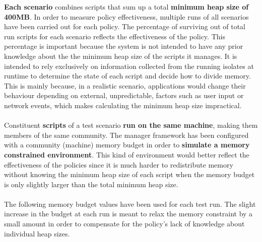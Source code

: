 \documentclass{l4proj}
\begin{document}
\hspace*{1em} \textbf{Each scenario} combines scripts that sum up a total \textbf{minimum heap size of 400MB}. In order to measure policy effectiveness, multiple runs of all scenarios have been carried out for each policy. The percentage of surviving out of total run scripts for each scenario reflects the effectiveness of the policy. This percentage is important because the system is not intended to have any prior knowledge about the the minimum heap size of the scripts it manages. It is intended to rely exclusively on information collected from the running isolates at runtime to determine the state of each script and decide how to divide memory. This is mainly because, in a realistic scenario, applications would change their behaviour depending on external, unpredictable, factors such as user input or network events, which makes calculating the minimum heap size impractical. 
\\\\
\hspace*{1em} Constituent \textbf{scripts} of a test scenario \textbf{run on the same machine}, making them members of the same community. The manager framework has been configured with a community (machine) memory budget in order to \textbf{simulate a memory constrained environment}. This kind of environment would better reflect the effectiveness of the policies since it is much harder to redistribute memory without knowing the minimum heap size of each script when the memory budget is only slightly larger than the total minimum heap size.
\\\\
\hspace*{1em} The following  memory budget values have been used for each test run. The slight increase in the budget at each run is meant to relax the memory constraint by a small amount in order to compensate for the policy's lack of knowledge about individual heap sizes. 
\end{document}
